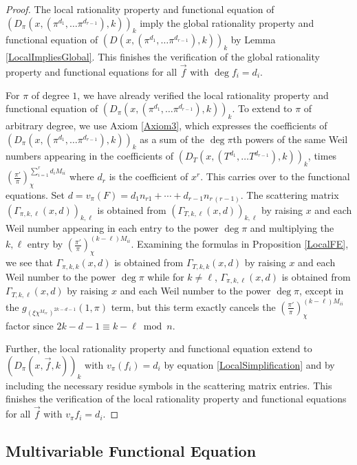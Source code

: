 \documentclass[11pt,letterpaper]{article}
\theoremstyle{definition}
\theoremstyle{remark}
\numberwithin{equation}{section}
\theoremstyle{dotless}
\begin{document}
\begin{proof}
The local rationality property and functional equation of $\left(D_\pi(x, (\pi^{d_1}, \ldots \pi^{d_{r-1}}), k)\right)_k$ imply the global rationality property and functional equation of $\left(D(x, (\pi^{d_1}, \ldots \pi^{d_{r-1}}), k)\right)_k$ by Lemma \ref{LocalImpliesGlobal}. This finishes the verification of the global rationality property and functional equations for all $\vec{f}$ with $\deg f_i=d_i$. 

For $\pi$ of degree $1$, we have already verified the local rationality property and functional equation of $\left(D_\pi(x, (\pi^{d_1}, \ldots \pi^{d_{r-1}}), k)\right)_k$. To extend to $\pi$ of arbitrary degree, we use Axiom \ref{Axiom3}, which expresses the coefficients of $\left(D_\pi(x, (\pi^{d_1}, \ldots \pi^{d_{r-1}}), k)\right)_k$ as a sum of the $\deg \pi$th powers of the same Weil numbers appearing in the coefficients of $\left(D_T(x, (T^{d_1}, \ldots T^{d_{r-1}}), k)\right)_k$, times $\left(\frac{\pi'}{\pi}\right)_\chi^{\sum_{i=1}^{r} d_i M_{ii}}$ where $d_r$ is the coefficient of $x^r$. This carries over to the functional equations. Set $d=v_{\pi}(F)= d_1 n_{r1} + \cdots + d_{r-1} n_{r \, (r-1)}$. The scattering matrix $\left(\Gamma_{\pi, k, \ell}(x, d)\right)_{k, \ell}$ is obtained from $\left(\Gamma_{T, k, \ell}(x, d) \right)_{k, \ell}$ by raising $x$ and each Weil number appearing in each entry to the power $\deg \pi$ and multiplying the $k,\ell$ entry by $\left(\frac{\pi'}{\pi}\right)_\chi^{(k-\ell)M_{ii}}$. Examining the formulas in Proposition \ref{LocalFE}, we see that $\Gamma_{\pi,k,k}(x, d)$ is obtained from $\Gamma_{T,k,k}(x, d)$ by raising $x$ and each Weil number to the power $\deg \pi$ while for $k\neq \ell$, $\Gamma_{\pi,k,\ell}(x, d)$ is obtained from $\Gamma_{T,k,\ell}(x, d)$ by raising $x$ and each Weil number to the power $\deg \pi$, except in the $g_{(\xi \chi^{M_{rr}})^{2k- d-1}}(1,\pi)$ term, but this term exactly cancels the $\left(\frac{\pi'}{\pi}\right)_\chi^{(k-\ell)M_{ii}}$ factor since $2k - d- 1 \equiv k-\ell \bmod n$. 

Further, the local rationality property and functional equation extend to $\left(D_\pi(x, \vec{f}, k)\right)_k$ with $v_\pi(f_i)=d_i$ by equation \eqref{LocalSimplification} and by including the necessary residue symbols in the scattering matrix entries. This finishes the verification of the local rationality property and functional equations for all $\vec{f}$ with $v_\pi f_i=d_i$. 
\end{proof}

\subsection{Multivariable Functional Equation}\label{ss-k-multi}
\end{document}
